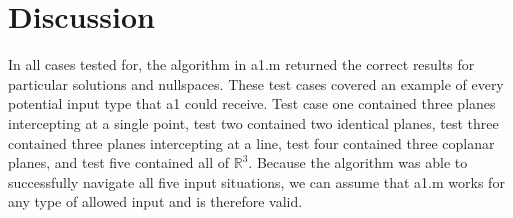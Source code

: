 \documentclass{article}
\begin{document}
	\section*{Discussion}
	In all cases tested for, the algorithm in a1.m returned the correct results for particular solutions and nullspaces. These test cases covered an example of every potential input type that a1 could receive. Test case one contained three planes intercepting at a single point, test two contained two identical planes, test three contained three planes intercepting at a line, test four contained three coplanar planes, and test five contained all of $\mathbb{R}^3$. Because the algorithm was able to successfully navigate all five input situations, we can assume that a1.m works for any type of allowed input and is therefore valid.
\end{document}
